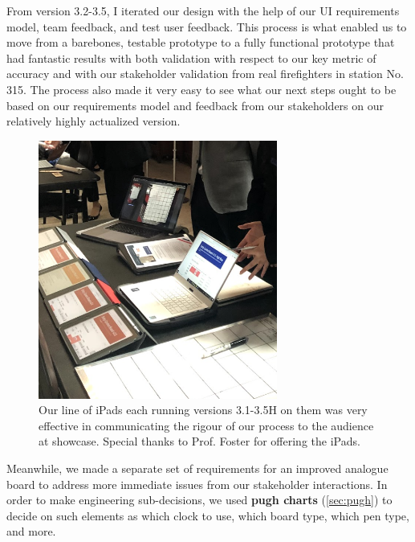 \documentclass[a4paper,12pt]{article}
\begin{document}
From version 3.2-3.5, I iterated our design with the help of our UI requirements model, team feedback, and test user feedback. This process is what enabled us to move from a barebones, testable prototype to a fully functional prototype that had fantastic results with both validation with respect to our key metric of accuracy and with our stakeholder validation from real firefighters in station No. 315. The process also made it very easy to see what our next steps ought to be based on our requirements model and feedback from our stakeholders on our relatively highly actualized version.

\begin{figure}[H]
\centering
\includegraphics[width=0.7\textwidth]{img/image019.png}
\caption{Our line of iPads each running versions 3.1-3.5H on them was very effective in communicating the rigour of our process to the audience at showcase. Special thanks to Prof. Foster for offering the iPads.}
\label{}
\end{figure}

Meanwhile, we made a separate set of requirements for an improved analogue board to address more immediate issues from our stakeholder interactions. In order to make engineering sub-decisions, we used \textbf{pugh charts} (\ref{sec:pugh}) to decide on such elements as which clock to use, which board type, which pen type, and more.
\end{document}
